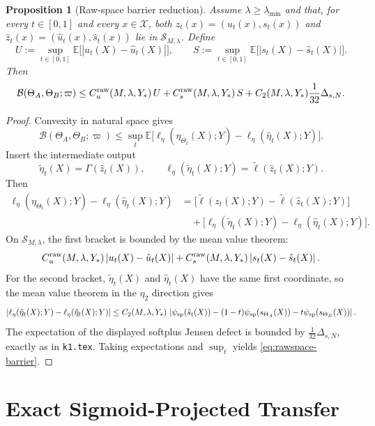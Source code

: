 \documentclass[11pt]{article}
\newtheorem{proposition}{Proposition}
\newcommand{\E}{\mathbb{E}}
\newcommand{\abs}[1]{\left\lvert #1 \right\rvert}
\newcommand{\cB}{\mathcal{B}}
\begin{document}
\begin{proposition}[Raw-space barrier reduction]
\label{prop:rawspace-barrier}
Assume $\lambda\ge \lambda_{\min}$ and that, for every $t\in[0,1]$ and every
$x\in\mathcal X$, both
$z_t(x)=(u_t(x),s_t(x))$ and $\hat z_t(x)=(\hat u_t(x),\hat s_t(x))$ lie in
$\mathcal S_{M,\lambda}$. Define
\[
  U:=\sup_{t\in[0,1]}\E\big[\abs{u_t(X)-\hat u_t(X)}\big],
  \qquad
  S:=\sup_{t\in[0,1]}\E\big[\abs{s_t(X)-\hat s_t(X)}\big].
\]
Then
\begin{equation}
  \cB(\Theta_A,\Theta_B;\varpi)
  \le
  C_u^{\rm raw}(M,\lambda,Y_\ast)\,U
  +
  C_s^{\rm raw}(M,\lambda,Y_\ast)\,S
  +
  C_2(M,\lambda,Y_\ast)\frac1{32}\Delta_{s,N}.
  \label{eq:rawspace-barrier}
\end{equation}
\end{proposition}

\begin{proof}
Convexity in natural space gives
\[
  \cB(\Theta_A,\Theta_B;\varpi)
  \le
  \sup_t
  \E\big[
    \ell_\eta(\eta_{\Theta_t}(X);Y)-\ell_\eta(\hat\eta_t(X);Y)
  \big].
\]
Insert the intermediate output
\[
  \tilde\eta_t(X)=\Gamma(\hat z_t(X)),
  \qquad
  \ell_\eta(\tilde\eta_t(X);Y)=\tilde\ell(\hat z_t(X);Y).
\]
Then
\begin{align*}
  \ell_\eta(\eta_{\Theta_t}(X);Y)-\ell_\eta(\hat\eta_t(X);Y)
  &=
  \bigl[
    \tilde\ell(z_t(X);Y)-\tilde\ell(\hat z_t(X);Y)
  \bigr]
  \\
  &\quad+
  \bigl[
    \ell_\eta(\tilde\eta_t(X);Y)-\ell_\eta(\hat\eta_t(X);Y)
  \bigr].
\end{align*}
On $\mathcal S_{M,\lambda}$, the first bracket is bounded by the mean value
theorem:
\[
  C_u^{\rm raw}(M,\lambda,Y_\ast)\abs{u_t(X)-\hat u_t(X)}
  +
  C_s^{\rm raw}(M,\lambda,Y_\ast)\abs{s_t(X)-\hat s_t(X)}.
\]
For the second bracket, $\tilde\eta_t(X)$ and $\hat\eta_t(X)$ have the same
first coordinate, so the mean value theorem in the $\eta_2$ direction gives
\[
  \abs{
    \ell_\eta(\tilde\eta_t(X);Y)-\ell_\eta(\hat\eta_t(X);Y)
  }
  \le
  C_2(M,\lambda,Y_\ast)\,
  \abs{
    \psi_{\rm sp}(\hat s_t(X))
    -
    (1-t)\psi_{\rm sp}(s_{\Theta_A}(X))
    -
    t\psi_{\rm sp}(s_{\Theta_B}(X))
  }.
\]
The expectation of the displayed softplus Jensen defect is bounded by
$\frac1{32}\Delta_{s,N}$, exactly as in \texttt{k1.tex}. Taking expectations and
$\sup_t$ yields \eqref{eq:rawspace-barrier}.
\end{proof}

\section{Exact Sigmoid-Projected Transfer}
\end{document}
